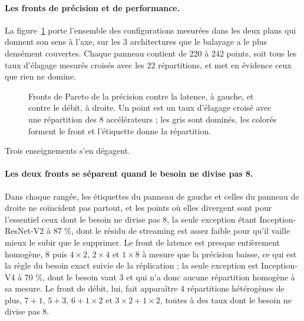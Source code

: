 \documentclass[11pt,a4paper]{report}
\begin{document}
\paragraph{Les fronts de précision et de performance.} La figure~\ref{fig:pareto_acc} porte l'ensemble des configurations mesurées dans les deux plans qui donnent son sens à l'axe, sur les 3 architectures que le balayage a le plus densément couvertes. Chaque panneau contient de 220 à 242 points, soit tous les taux d'élagage mesurés croisés avec les 22 répartitions, et met en évidence ceux que rien ne domine.

\begin{figure}[H]
    \centering
    
    \caption[Fronts de Pareto de la précision contre la performance]{Fronts de Pareto de la précision contre la latence, à gauche, et contre le débit, à droite. Un point est un taux d'élagage croisé avec une répartition des 8 accélérateurs ; les gris sont dominés, les colorés forment le front et l'étiquette donne la répartition.}
    \label{fig:pareto_acc}
\end{figure}

Trois enseignements s'en dégagent.

\paragraph{Les deux fronts se séparent quand le besoin ne divise pas 8.} Dans chaque rangée, les étiquettes du panneau de gauche et celles du panneau de droite ne coïncident pas partout, et les points où elles divergent sont pour l'essentiel ceux dont le besoin ne divise pas 8, la seule exception étant Inception-ResNet-V2 à 87 \%, dont le résidu de streaming est assez faible pour qu'il vaille mieux le subir que le supprimer. Le front de latence est presque entièrement homogène, $8$ puis $4\times2$, $2\times4$ et $1\times8$ à mesure que la précision baisse, ce qui est la règle du besoin exact suivie de la réplication ; la seule exception est Inception-V4 à 70 \%, dont le besoin vaut 3 et qui n'a donc aucune répartition homogène à sa mesure. Le front de débit, lui, fait apparaître 4 répartitions hétérogènes de plus, $7{+}1$, $5{+}3$, $6{+}1\times2$ et $3\times2{+}1\times2$, toutes à des taux dont le besoin ne divise pas 8.
\end{document}
